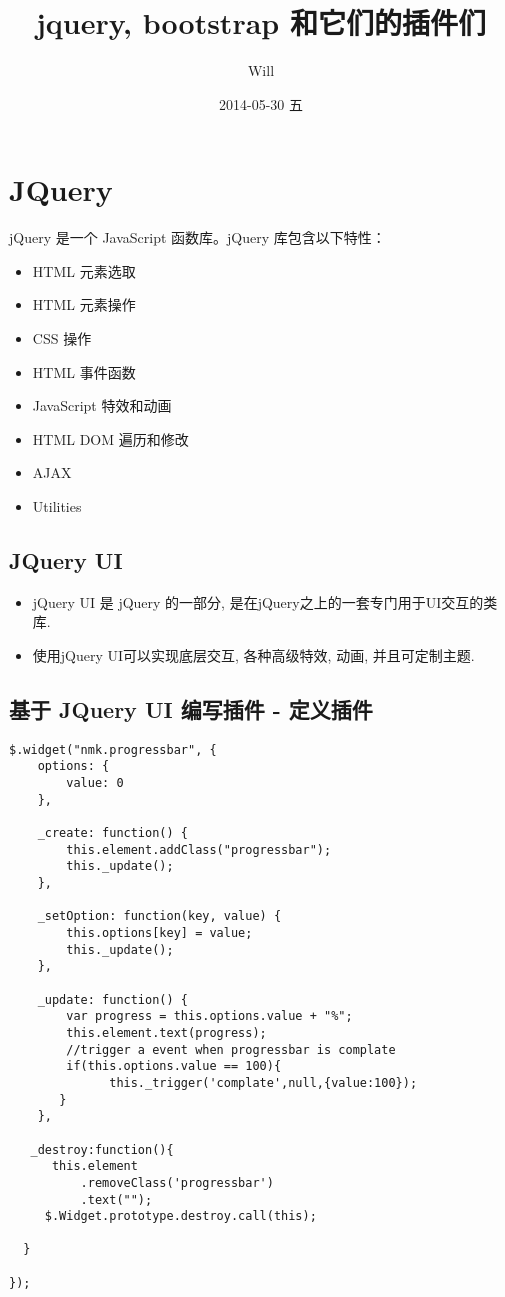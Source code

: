 \documentclass[11pt]{article}
\author{Will}
\date{2014-05-30 五}
\title{jquery, bootstrap 和它们的插件们}
\begin{document}
\maketitle
\setcounter{tocdepth}{2}
\tableofcontents


\section*{JQuery}
\label{sec-1}
jQuery 是一个 JavaScript 函数库。jQuery 库包含以下特性：
\begin{itemize}
\item HTML 元素选取
\item HTML 元素操作
\item CSS 操作
\item HTML 事件函数
\item JavaScript 特效和动画
\item HTML DOM 遍历和修改
\item AJAX
\item Utilities
\end{itemize}

\subsection*{JQuery UI}
\label{sec-1-1}
\begin{itemize}
\item jQuery UI 是 jQuery 的一部分, 是在jQuery之上的一套专门用于UI交互的类库.
\item 使用jQuery UI可以实现底层交互, 各种高级特效, 动画, 并且可定制主题.
\end{itemize}

\subsection*{基于 JQuery UI 编写插件 - 定义插件}
\label{sec-1-2}
\begin{verbatim}
$.widget("nmk.progressbar", {
    options: {
        value: 0
    },

    _create: function() {
        this.element.addClass("progressbar");
        this._update();
    },

    _setOption: function(key, value) {
        this.options[key] = value;
        this._update();
    },

    _update: function() {
        var progress = this.options.value + "%";
        this.element.text(progress);
        //trigger a event when progressbar is complate
        if(this.options.value == 100){
              this._trigger('complate',null,{value:100});
       }
    },

   _destroy:function(){
      this.element
          .removeClass('progressbar')
          .text("");
     $.Widget.prototype.destroy.call(this);

  }

});
\end{verbatim}
\end{document}
